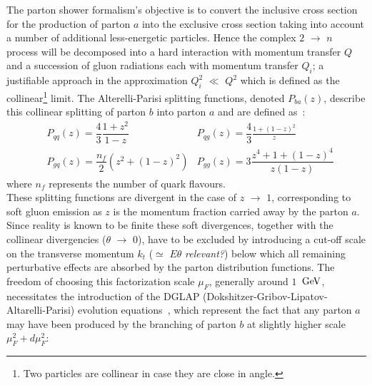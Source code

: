 The parton shower formalism's objective is to convert the inclusive cross section for the production of parton $a$ into the exclusive cross section taking into account a number of additional less-energetic particles.
Hence the complex $2$ $\rightarrow$ $n$ process will be decomposed into a hard interaction with momentum transfer $Q$ and a succession of gluon radiations each with momentum transfer $Q_{i}$; a justifiable approach in the approximation $Q_{i}^{2}$ $\ll$ $Q^2$ which is defined as the collinear\footnote{Two particles are collinear in case they are close in angle.} limit. 
The Alterelli-Parisi splitting functions, denoted $P_{ba}(z)$, describe this collinear splitting of parton $b$ into parton $a$ and are defined as~\cite{}:
\begin{eqnarray}
 & P_{qq}(z) = \dfrac{4}{3} \dfrac{1+z^{2}}{1-z}    & P_{qg}(z) = \dfrac{4}{3} \frac{1+(1-z)^{2}}{z} \\
 & P_{gq}(z) = \dfrac{n_{f}}{2} (z^{2} + (1-z)^{2}) & P_{gg}(z) = 3 \dfrac{z^{4}+1+(1-z)^{4}}{z(1-z)}
\end{eqnarray}
where $n_{f}$ represents the number of quark flavours.
\\
These splitting functions are divergent in the case of $z$ $\rightarrow$ $1$, corresponding to soft gluon emission as $z$ is the momentum fraction carried away by the parton $a$. 
Since reality is known to be finite these soft divergences, together with the collinear divergencies ($\theta$ $\rightarrow$ $0$), have to be excluded by introducing a cut-off scale on the transverse momentum $k_{t}$ ($\simeq$ $E\theta$ \textit{relevant?}) below which all remaining perturbative effects are absorbed by the parton distribution functions. 
The freedom of choosing this factorization scale $\mu_{F}$, generally around $1$ $\, \mathrm{GeV}$, necessitates the introduction of the DGLAP (Dokshitzer-Gribov-Lipatov-Altarelli-Parisi) evolution equations~\cite{}, which represent the fact that any parton $a$ may have been produced by the branching of parton $b$ at slightly higher scale $\mu_{F}^2 + d\mu_{F}^2$:\\
